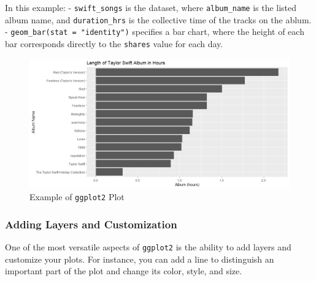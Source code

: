 \documentclass[
]{book}
\newenvironment{Shaded}{\begin{snugshade}}{\end{snugshade}}
\newcommand{\AttributeTok}[1]{\textcolor[rgb]{0.13,0.29,0.53}{#1}}
\newcommand{\CommentTok}[1]{\textcolor[rgb]{0.56,0.35,0.01}{\textit{#1}}}
\newcommand{\DecValTok}[1]{\textcolor[rgb]{0.00,0.00,0.81}{#1}}
\newcommand{\FunctionTok}[1]{\textcolor[rgb]{0.13,0.29,0.53}{\textbf{#1}}}
\newcommand{\NormalTok}[1]{#1}
\newcommand{\SpecialCharTok}[1]{\textcolor[rgb]{0.81,0.36,0.00}{\textbf{#1}}}
\newcommand{\StringTok}[1]{\textcolor[rgb]{0.31,0.60,0.02}{#1}}
\begin{document}
In this example: - \texttt{swift\_songs} is the dataset, where \texttt{album\_name} is the listed album name, and \texttt{duration\_hrs} is the collective time of the tracks on the ablum. - \texttt{geom\_bar(stat\ =\ "identity")} specifies a bar chart, where the height of each bar corresponds directly to the \texttt{shares} value for each day.

\begin{figure}
\centering
\includegraphics[width=1\textwidth,height=\textheight]{images/ggplot2_example1.png}
\caption{Example of \texttt{ggplot2} Plot}
\end{figure}

\subsubsection*{Adding Layers and Customization}\label{adding-layers-and-customization}

One of the most versatile aspects of \texttt{ggplot2} is the ability to add layers and customize your plots. For instance, you can add a line to distinguish an important part of the plot and change its color, style, and size.

\begin{Shaded}
\end{Shaded}
\end{document}

